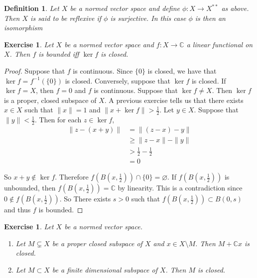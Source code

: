 \documentclass[12pt]{amsart}
\newtheorem{defn}[thm]{Definition}
\newtheorem{ex}[thm]{Exercise}
\newcommand{\C}{\mathbb{C}}
\begin{document}
	\begin{defn}
		Let $X$ be a normed vector space and define $\phi:X \rightarrow X^{**}$ as above. Then $X$ is said to be reflexive if $\phi$ is surjective. In this case $\phi$ is then an isomorphism
	\end{defn}
	
	\begin{ex}
		Let $X$ be a normed vector space and $f:X \rightarrow \C$ a linear functional on $X$. Then $f$ is bounded iff $\ker f$ is closed. 
	\end{ex}
	
	\begin{proof}
		Suppose that $f$ is continuous. Since $\{0\}$ is closed, we have that $\ker f = f^{-1}(\{0\})$ is closed. Conversely, suppose that $\ker f$ is closed. If $\ker f = X$, then $f =0$ and $f$ is continuous. Suppose that $\ker f \neq X$. Then $\ker f$ is a proper, closed subspace of $X$. A previous exercise tells us that there exists $x \in X$ such that $\|x \|= 1$ and $\|x + \ker f \|> \frac{1}{2}$. Let $y \in X$. Suppose that $\|y \|< \frac{1}{2}$. Then for each $z \in \ker f$, 
		\begin{align*}
			\|z -  (x+y)\|
			& = \|(z-x) -y \|\\
			& \geq \|z-x \|- \|y \|\\
			& > \frac{1}{2} - \frac{1}{2} \\
			&=0
		\end{align*}
		
		So $x+y \not \in \ker f$. Therefore $f(B(x,\frac{1}{2})) \cap \{0\} = \varnothing$. If $f(B(x,\frac{1}{2})) $ is unbounded, then $f(B(x,\frac{1}{2})) = \C$ by linearity. This is a contradiction since $0 \not \in f(B(x,\frac{1}{2}))$. So There exists $s > 0$ such that $f(B(x,\frac{1}{2})) \subset B(0,s)$ and thus $f$ is bounded. 
	\end{proof}
	
	\begin{ex}
		Let $X$ be a normed vector space. 
		\begin{enumerate}
			\item Let $M \subsetneq X$ be a proper closed subspace of $X$ and $x \in X \setminus M$. Then $M + \C x$ is closed.
			\item Let $M \subset X$ be a finite dimensional subspace of $X$. Then $M$ is closed.
		\end{enumerate}
	\end{ex}
	
\end{document}

